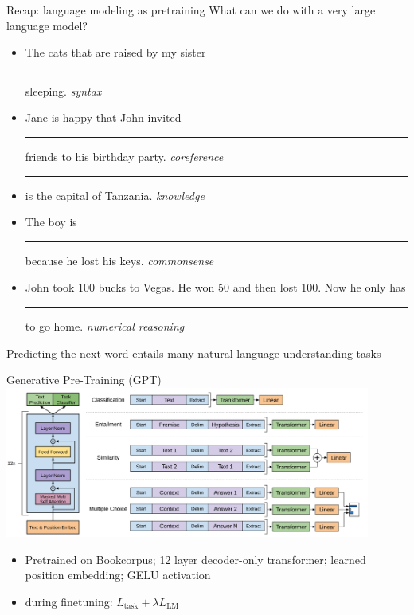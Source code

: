 \documentclass[usenames,dvipsnames,notes,11pt,aspectratio=169,hyperref={colorlinks=true, linkcolor=blue}]{beamer}
\begin{document}
\begin{frame}
    {Recap: language modeling as pretraining}
    What can we do with a very large language model?
    \begin{itemize}
        \itemsep1em
        \item The cats that are raised by my sister \rule{1.5cm}{0.5mm} sleeping. \hfill \textit{syntax}
        \item Jane is happy that John invited \rule{1.5cm}{0.5mm} friends to his birthday party. \hfill \textit{coreference}
        \item \rule{1.5cm}{0.5mm} is the capital of Tanzania. \hfill \textit{knowledge}
        \item The boy is \rule{1.5cm}{0.5mm} because he lost his keys.  \hfill \textit{commonsense}
        \item John took 100 bucks to Vegas. He won 50 and then lost 100. Now he only has \rule{1.5cm}{0.5mm} to go home. \hfill \textit{numerical reasoning}
    \end{itemize}
    Predicting the next word entails many natural language understanding tasks
\end{frame}

\begin{frame}
    {Generative Pre-Training (GPT)}
        \includegraphics[width=0.9\textwidth]{figures/gpt1}

    \begin{itemize}
        \item Pretrained on Bookcorpus; 12 layer decoder-only transformer; learned position embedding; GELU activation
        \item {} during finetuning: $L_{\text{task}} + \lambda L_{\text{LM}}$
    \end{itemize}
\end{frame}
\end{document}
